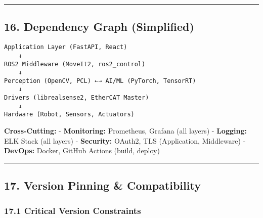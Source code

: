 \documentclass[
]{article}
\begin{document}
\begin{center}\rule{0.5\linewidth}{0.5pt}\end{center}

\hypertarget{dependency-graph-simplified}{%
\subsection{16. Dependency Graph
(Simplified)}\label{dependency-graph-simplified}}

\begin{verbatim}
Application Layer (FastAPI, React)
    ↓
ROS2 Middleware (MoveIt2, ros2_control)
    ↓
Perception (OpenCV, PCL) ←→ AI/ML (PyTorch, TensorRT)
    ↓
Drivers (librealsense2, EtherCAT Master)
    ↓
Hardware (Robot, Sensors, Actuators)
\end{verbatim}

\textbf{Cross-Cutting:} - \textbf{Monitoring:} Prometheus, Grafana (all
layers) - \textbf{Logging:} ELK Stack (all layers) - \textbf{Security:}
OAuth2, TLS (Application, Middleware) - \textbf{DevOps:} Docker, GitHub
Actions (build, deploy)

\begin{center}\rule{0.5\linewidth}{0.5pt}\end{center}

\hypertarget{version-pinning-compatibility}{%
\subsection{17. Version Pinning \&
Compatibility}\label{version-pinning-compatibility}}

\hypertarget{critical-version-constraints}{%
\subsubsection{17.1 Critical Version
Constraints}\label{critical-version-constraints}}
\end{document}
